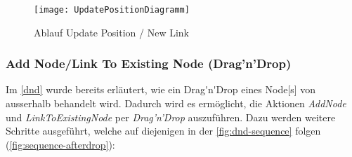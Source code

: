 \begin{figure}[htbp]
\centerline{\texttt{[image: UpdatePositionDiagramm]}}
\caption{Ablauf Update Position / New Link}
\label{fig:sequence-movenode}
\end{figure}

\subsubsection{Add Node/Link To Existing \gls{Node} (Drag'n'Drop)}
Im \autoref{dnd} wurde bereits erläutert, wie ein \gls{Drag'n'Drop} eines \gls{Node}[s] von ausserhalb behandelt wird. Dadurch wird es ermöglicht, die Aktionen \textit{AddNode} und \textit{LinkToExistingNode} per \textit{Drag'n'Drop} auszuführen. Dazu werden weitere Schritte ausgeführt, welche auf diejenigen in der \autoref{fig:dnd-sequence} folgen (\autoref{fig:sequence-afterdrop}):
